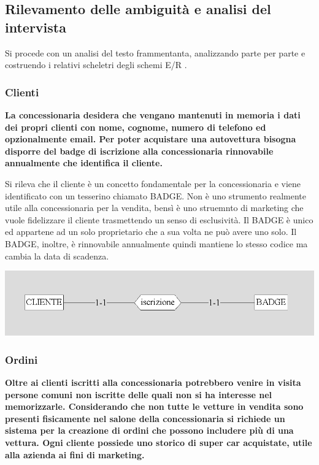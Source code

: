 \documentclass[12pt]{article}
\begin{document}
\subsection{Rilevamento delle ambiguità e analisi del intervista} 

Si procede con un analisi del testo frammentanta, analizzando parte per parte e
costruendo i relativi scheletri degli schemi E/R .

\subsubsection{Clienti}
\textbf{La concessionaria desidera che vengano mantenuti in memoria i dati dei
propri clienti con nome, cognome, numero di telefono ed opzionalmente email. Per
poter acquistare una autovettura bisogna disporre del badge di iscrizione alla
concessionaria rinnovabile annualmente che identifica il cliente.}

Si rileva che il cliente è un concetto fondamentale per la concessionaria e
viene identificato con un tesserino chiamato BADGE. Non è uno strumento
realmente utile alla concessionaria per la vendita, bensì è uno struemnto di
marketing che vuole fidelizzare il cliente trasmettendo un senso di esclusività.
Il BADGE è unico ed appartene ad un solo proprietario che a sua volta ne può
avere uno solo. Il BADGE, inoltre, è rinnovabile annualmente quindi mantiene lo
stesso codice ma cambia la data di scadenza.


\begin{center}
    \includegraphics[width=\linewidth]{images/cliente.png}
\end{center}

\subsubsection{Ordini}
\textbf{Oltre ai clienti iscritti alla concessionaria potrebbero venire in
visita persone comuni non iscritte delle quali non si ha interesse nel
memorizzarle. Considerando che non tutte le vetture in vendita sono presenti
fisicamente nel salone della concessionaria si richiede un sistema per la
creazione di ordini che possono includere più di una vettura. Ogni cliente
possiede uno storico di super car acquistate, utile alla azienda ai fini di
marketing.}
\end{document}
